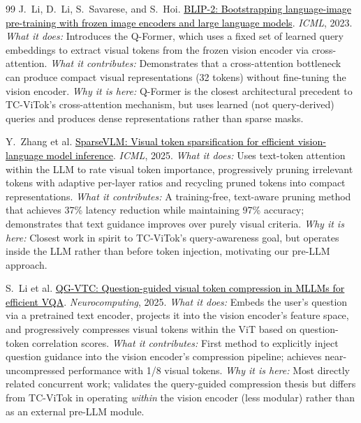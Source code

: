 \documentclass[11pt,twocolumn]{article}
\newcommand{\paperhref}[2]{\href{#1}{\textcolor{black}{#2}}}
\begin{document}
\begin{thebibliography}{99}
J.~Li, D.~Li, S.~Savarese, and S.~Hoi.
\newblock \paperhref{https://arxiv.org/abs/2301.12597}{BLIP-2: Bootstrapping language-image pre-training with frozen image encoders and large language models}.
\newblock \textit{ICML}, 2023.
\newblock \textit{What it does:} Introduces the Q-Former, which uses a fixed set of learned query embeddings to extract visual tokens from the frozen vision encoder via cross-attention.
\newblock \textit{What it contributes:} Demonstrates that a cross-attention bottleneck can produce compact visual representations (32 tokens) without fine-tuning the vision encoder.
\newblock \textit{Why it is here:} Q-Former is the closest architectural precedent to TC-ViTok's cross-attention mechanism, but uses learned (not query-derived) queries and produces dense representations rather than sparse masks.

Y.~Zhang et al.
\newblock \paperhref{https://arxiv.org/abs/2504.00654}{SparseVLM: Visual token sparsification for efficient vision-language model inference}.
\newblock \textit{ICML}, 2025.
\newblock \textit{What it does:} Uses text-token attention within the LLM to rate visual token importance, progressively pruning irrelevant tokens with adaptive per-layer ratios and recycling pruned tokens into compact representations.
\newblock \textit{What it contributes:} A training-free, text-aware pruning method that achieves 37\% latency reduction while maintaining 97\% accuracy; demonstrates that text guidance improves over purely visual criteria.
\newblock \textit{Why it is here:} Closest work in spirit to TC-ViTok's query-awareness goal, but operates inside the LLM rather than before token injection, motivating our pre-LLM approach.

S.~Li et al.
\newblock \paperhref{https://doi.org/10.1016/j.neucom.2025.127012}{QG-VTC: Question-guided visual token compression in MLLMs for efficient VQA}.
\newblock \textit{Neurocomputing}, 2025.
\newblock \textit{What it does:} Embeds the user's question via a pretrained text encoder, projects it into the vision encoder's feature space, and progressively compresses visual tokens within the ViT based on question-token correlation scores.
\newblock \textit{What it contributes:} First method to explicitly inject question guidance into the vision encoder's compression pipeline; achieves near-uncompressed performance with 1/8 visual tokens.
\newblock \textit{Why it is here:} Most directly related concurrent work; validates the query-guided compression thesis but differs from TC-ViTok in operating \emph{within} the vision encoder (less modular) rather than as an external pre-LLM module.


\end{thebibliography}
\end{document}
